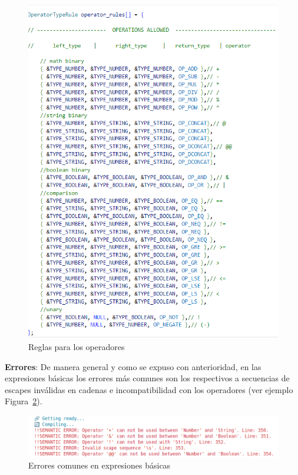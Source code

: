 \documentclass{llncs}
\begin{document}
\begin{figure}
\centering
\includegraphics[width=1\textwidth]{images/op_rules.png}
\caption{Reglas para los operadores}
\label{fig:operadores}
\end{figure}

\textbf{Errores}: De manera general y como se expuso con anterioridad, en las expresiones básicas los errores más comunes son 
los respectivos a secuencias de escapes inválidas en cadenas e incompatibilidad con los operadores (ver ejemplo Figura~\ref{fig:errores_1}).
\begin{figure}[h]
\centering
\includegraphics[width=1\textwidth]{images/basic_errors.png}
\caption{Errores comunes en expresiones básicas}
\label{fig:errores_1}
\end{figure}
\end{document}
